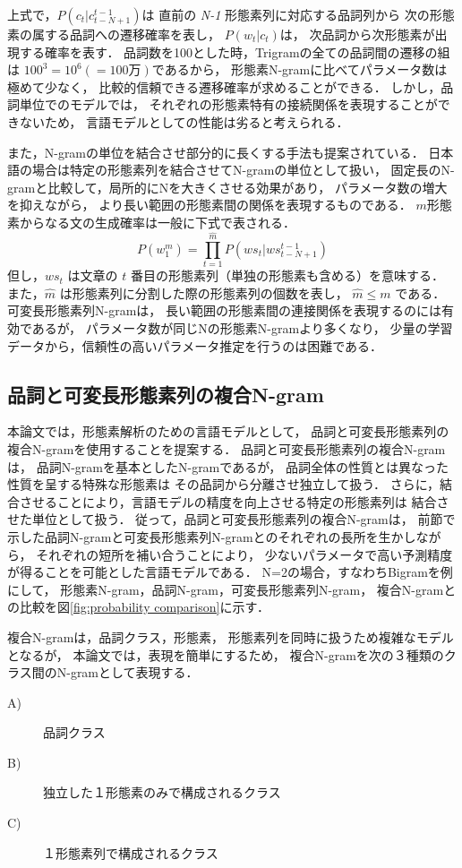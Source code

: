 上式で，$P(c_t|c_{t-N+1}^{t-1})$は
直前の {\it N-1} 形態素列に対応する品詞列から
次の形態素の属する品詞への遷移確率を表し，
$P(w_t | c_t)$は，
次品詞から次形態素が出現する確率を表す．
品詞数を100とした時，Trigramの全ての品詞間の遷移の組は
$ 100^3=10^6 (=100万)$であるから，
形態素N-gramに比べてパラメータ数は極めて少なく，
比較的信頼できる遷移確率が求めることができる．
しかし，品詞単位でのモデルでは，
それぞれの形態素特有の接続関係を表現することができないため，
言語モデルとしての性能は劣ると考えられる．

また，N-gramの単位を結合させ部分的に長くする手法も提案されている\cite{Giachin}．
日本語の場合は特定の形態素列を結合させてN-gramの単位として扱い，
固定長のN-gramと比較して，局所的にNを大きくさせる効果があり，
パラメータ数の増大を抑えながら，
より長い範囲の形態素間の関係を表現するものである．
$m$形態素からなる文の生成確率は一般に下式で表される．
\begin{equation}
 P(w_1^m) = \prod_{t=1}^{\hat{m}} P(ws_t | ws_{t-N+1}^{t-1})
\end{equation}
但し，$ws_t$ は文章の $t$ 番目の形態素列（単独の形態素も含める）を意味する．
また，$\hat{m}$ は形態素列に分割した際の形態素列の個数を表し，
$\hat{m} \leq m$ である．
可変長形態素列N-gramは，
長い範囲の形態素間の連接関係を表現するのには有効であるが，
パラメータ数が同じNの形態素N-gramより多くなり，
少量の学習データから，信頼性の高いパラメータ推定を行うのは困難である．





\subsection{品詞と可変長形態素列の複合N-gram}
本論文では，形態素解析のための言語モデルとして，
品詞と可変長形態素列の複合N-gramを使用することを提案する．
品詞と可変長形態素列の複合N-gramは，
品詞N-gramを基本としたN-gramであるが，
品詞全体の性質とは異なった性質を呈する特殊な形態素は
その品詞から分離させ独立して扱う．
さらに，結合させることにより，言語モデルの精度を向上させる特定の形態素列は
結合させた単位として扱う．
従って，品詞と可変長形態素列の複合N-gramは，
前節で示した品詞N-gramと可変長形態素列N-gramとのそれぞれの長所を生かしながら，
それぞれの短所を補い合うことにより，
少ないパラメータで高い予測精度が得ることを可能とした言語モデルである．
N=2の場合，すなわちBigramを例にして，
形態素N-gram，品詞N-gram，可変長形態素列N-gram，
複合N-gramとの比較を図\ref{fig:probability comparison}に示す．

複合N-gramは，品詞クラス，形態素，
形態素列を同時に扱うため複雑なモデルとなるが，
本論文では，表現を簡単にするため，
複合N-gramを次の３種類のクラス間のN-gramとして表現する．
\begin{description}
\item[A)] 品詞クラス
\item[B)] 独立した１形態素のみで構成されるクラス
\item[C)] １形態素列で構成されるクラス
\end{description}

